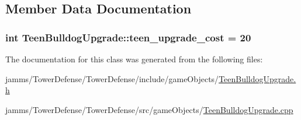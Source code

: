 \subsection{Member Data Documentation}
\hypertarget{class_teen_bulldog_upgrade_acba32d7acc3ed3fd9317153e9d4f6b02}{
\subsubsection[{teen\+\_\+upgrade\+\_\+cost}]{\setlength{\rightskip}{0pt plus 5cm}int Teen\+Bulldog\+Upgrade\+::teen\+\_\+upgrade\+\_\+cost = 20\hspace{0.3cm}{\ttfamily [static]}}}\label{class_teen_bulldog_upgrade_acba32d7acc3ed3fd9317153e9d4f6b02}


The documentation for this class was generated from the following files\+:\begin{DoxyCompactItemize}
\item 
jamms/\+Tower\+Defense/\+Tower\+Defense/include/game\+Objects/\hyperlink{_teen_bulldog_upgrade_8h}{Teen\+Bulldog\+Upgrade.\+h}\item 
jamms/\+Tower\+Defense/\+Tower\+Defense/src/game\+Objects/\hyperlink{_teen_bulldog_upgrade_8cpp}{Teen\+Bulldog\+Upgrade.\+cpp}\end{DoxyCompactItemize}
